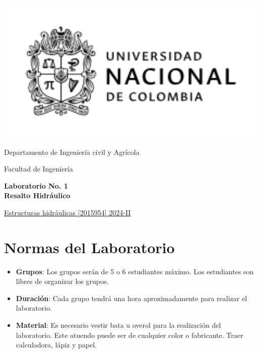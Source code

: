 \documentclass[10pt, a4paper]{exam}
\begin{document}
	\noindent
	\begin{minipage}[l]{0.1\textwidth}
		\noindent
		\includegraphics[width=2.8\textwidth]{ESCUDO.png}
	\end{minipage}
\hfill
\begin{minipage}[c]{0.8\textwidth}
	\begin{center}
		{\large  Departamento de Ingeniería civil y Agrícola\par
		\large	Facultad de Ingeniería	\par
    \large \textbf{Laboratorio No. 1 \\ Resalto Hidráulico}	\par
} %
	\end{center}
\end{minipage}
\par
\vspace{0.2in}
\noindent
    \uline{Estructuras hidráulicas [2015954]	\hfill 2024-II	}
\par 
\vspace{0.15in}
\noindent

\section{Normas del Laboratorio}
\begin{itemize}
    \item \textbf{Grupos}: Los grupos serán de 5 o 6 estudiantes máximo. Los estudiantes son libres de organizar los grupos.
    
    \item \textbf{Duración}: Cada grupo tendrá una hora aproximadamente para realizar el laboratorio.
    
    \item \textbf{Material}: Es necesario vestir bata u overol para la realización del laboratorio. Este atuendo puede ser de cualquier color o fabricante. Traer calculadora, lápiz y papel.
\end{itemize}
\end{document}
